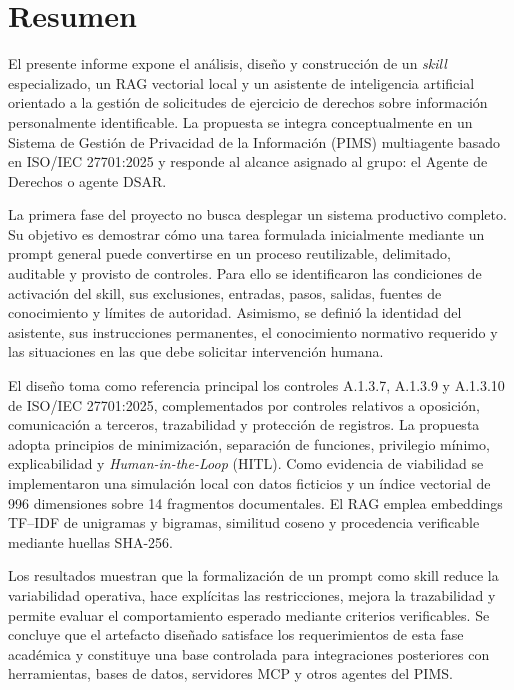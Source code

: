 \documentclass[11pt,a4paper]{article}
\newcommand{\HITL}{\textit{Human-in-the-Loop} (HITL)}
\begin{document}

\section*{Resumen}

El presente informe expone el análisis, diseño y construcción de un \textit{skill} especializado, un RAG vectorial local y un asistente de inteligencia artificial orientado a la gestión de solicitudes de ejercicio de derechos sobre información personalmente identificable. La propuesta se integra conceptualmente en un Sistema de Gestión de Privacidad de la Información (PIMS) multiagente basado en ISO/IEC 27701:2025 y responde al alcance asignado al grupo: el Agente de Derechos o agente DSAR.

La primera fase del proyecto no busca desplegar un sistema productivo completo. Su objetivo es demostrar cómo una tarea formulada inicialmente mediante un prompt general puede convertirse en un proceso reutilizable, delimitado, auditable y provisto de controles. Para ello se identificaron las condiciones de activación del skill, sus exclusiones, entradas, pasos, salidas, fuentes de conocimiento y límites de autoridad. Asimismo, se definió la identidad del asistente, sus instrucciones permanentes, el conocimiento normativo requerido y las situaciones en las que debe solicitar intervención humana.

El diseño toma como referencia principal los controles A.1.3.7, A.1.3.9 y A.1.3.10 de ISO/IEC 27701:2025, complementados por controles relativos a oposición, comunicación a terceros, trazabilidad y protección de registros. La propuesta adopta principios de minimización, separación de funciones, privilegio mínimo, explicabilidad y \HITL. Como evidencia de viabilidad se implementaron una simulación local con datos ficticios y un índice vectorial de 996 dimensiones sobre 14 fragmentos documentales. El RAG emplea embeddings TF--IDF de unigramas y bigramas, similitud coseno y procedencia verificable mediante huellas SHA-256.

Los resultados muestran que la formalización de un prompt como skill reduce la variabilidad operativa, hace explícitas las restricciones, mejora la trazabilidad y permite evaluar el comportamiento esperado mediante criterios verificables. Se concluye que el artefacto diseñado satisface los requerimientos de esta fase académica y constituye una base controlada para integraciones posteriores con herramientas, bases de datos, servidores MCP y otros agentes del PIMS.
\end{document}
